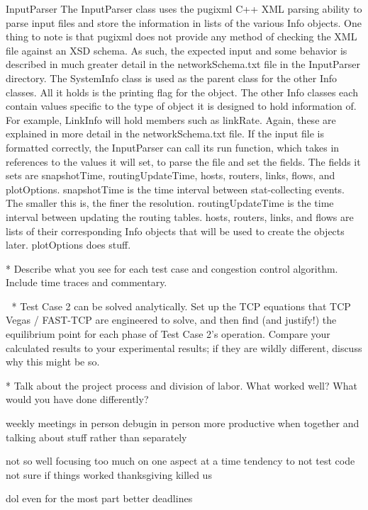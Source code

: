 \documentclass{article}
\begin{document}
InputParser
    The InputParser class uses the pugixml C++ XML parsing ability to parse input files and store the information in lists of the various Info objects. One thing to note is that pugixml does not provide any method of checking the XML file against an XSD schema. As such, the expected input and some behavior is described in much greater detail in the networkSchema.txt file in the InputParser directory.
    The SystemInfo class is used as the parent class for the other Info classes. All it holds is the printing flag for the object. The other Info classes each contain values specific to the type of object it is designed to hold information of. For example, LinkInfo will hold members such as linkRate. Again, these are explained in more detail in the networkSchema.txt file.
If the input file is formatted correctly, the InputParser can call its run function, which takes in references to the values it will set, to parse the file and set the fields. The fields it sets are snapshotTime, routingUpdateTime, hosts, routers, links, flows, and plotOptions. snapshotTime is the time interval between stat-collecting events. The smaller this is, the finer the resolution. routingUpdateTime is the time interval between updating the routing tables. hosts, routers, links, and flows are lists of their corresponding Info objects that will be used to create the objects later. plotOptions does stuff.




* Describe what you see for each test case and
congestion control algorithm. Include time traces
and commentary.



* Test Case 2 can be solved analytically. Set up
the TCP equations that TCP Vegas / FAST-TCP are
engineered to solve, and then find (and justify!)
the equilibrium point for each phase of Test Case
2's operation. Compare your calculated results to
your experimental results; if they are wildly
different, discuss why this might be so.



* Talk about the project process and division of
labor. What worked well? What would you have done
differently?

weekly meetings  in person
debugin in person
more productive when together and talking about stuff rather than separately

not so well
focusing too much on one aspect at a time
tendency to not test code
    not sure if things worked
thanksgiving killed us

dol
even for the most part
better deadlines
\end{document}
